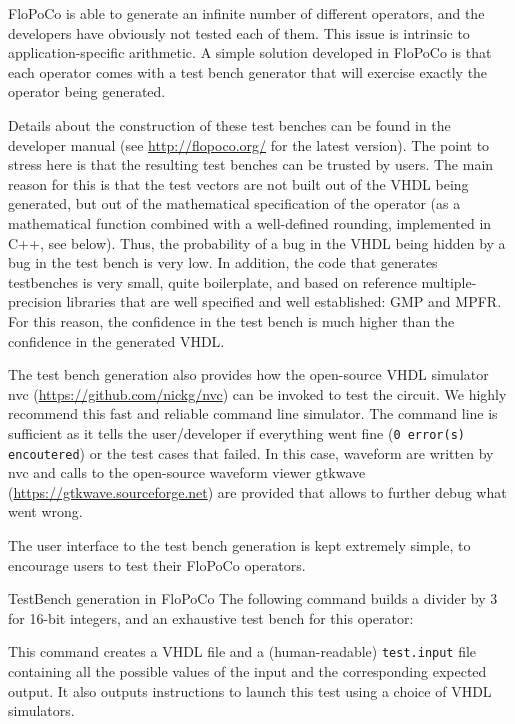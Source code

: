 \documentclass{article}
\begin{document}
FloPoCo is able to generate an infinite number of different operators, and the developers have obviously not tested each of them.
This issue is intrinsic to application-specific arithmetic.
A simple solution developed in FloPoCo is that  each operator comes with a test bench generator that will exercise exactly the operator being generated.

Details about the construction of these test benches can be found in the developer manual (see \url{http://flopoco.org/} for the latest version).
The point  to stress here is that the resulting test benches can be trusted by users.
The main reason for this is that the test vectors are not built out of the VHDL being generated, but out of the mathematical specification of the operator (as a mathematical function combined with a well-defined rounding, implemented in C++, see  below).
Thus, the probability of a bug in the VHDL being hidden by a bug in the test bench is very low.
In addition,  the code that generates testbenches is very small, quite boilerplate, and based on reference multiple-precision libraries that are well specified and well established: {GMP} and {MPFR}.
For this reason, the confidence in the test bench is much higher than the confidence in the generated VHDL.

The test bench generation also provides how the open-source VHDL simulator nvc (\url{https://github.com/nickg/nvc}) can be invoked to test the circuit. 
We highly recommend this fast and reliable command line simulator.
The command line is sufficient as it tells the user/developer if everything went fine (\texttt{0 error(s) encoutered}) or the test cases that failed.
In this case, waveform are written by nvc and calls to the open-source waveform viewer gtkwave (\url{https://gtkwave.sourceforge.net}) are provided that allows to further debug what went wrong.

The user interface to the test bench generation is kept extremely simple, to encourage users to test their FloPoCo operators.

\begin{flopocobox}{TestBench generation in FloPoCo}
  The following command builds a divider by 3 for 16-bit integers, and an exhaustive test bench for this operator:
 

  This command creates a VHDL file and a (human-readable) \texttt{test.input} file containing all the possible values of the input and the corresponding expected output.
  It also outputs instructions to launch this test using a choice of VHDL simulators.
\end{flopocobox}
\end{document}
